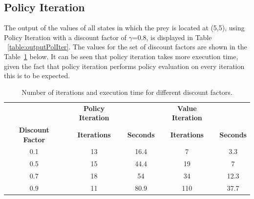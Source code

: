 \documentclass[11pt]{article}
\begin{document}
\subsection{Policy Iteration}
The output of the values of all states in which the prey is located at (5,5), using Policy Iteration with a discount factor of $\gamma$=0.8, is displayed in Table ~\ref{table:outputPolIter}.
The values for the set of discount factors are shown in the Table~\ref{table:discFactors} below. It can be seen that policy iteration takes more execution time, given the fact that policy iteration performs policy evaluation on every iteration this is to be expected.
\begin{center}
\begin{table}[ht]
{\small
\hfill{}
\begin{tabular}{c|c|c|c|c}
 &  \textbf{Policy Iteration} &  & \textbf{Value Iteration} &\\
\textbf{Discount Factor} &  \textbf{Iterations} & \textbf{Seconds} & \textbf{Iterations} & \textbf{Seconds}\\
	\hline
0.1 & 13 & 16.4 & 7 & 3.3\\
0.5 & 15 & 44.4 & 19& 7\\
0.7 & 18 & 54 & 34& 12.3\\
0.9 & 11 & 80.9 & 110& 37.7\\
\end{tabular}}
\hfill{}
\caption{Number of iterations and execution time for different discount factors.}
\label{table:discFactors}
\end{table}
\end{center}
\end{document}
